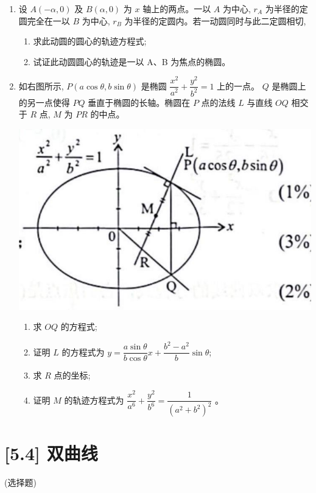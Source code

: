 \documentclass[10pt]{article}
\begin{document}
\begin{enumerate}
  \item 设 $A(-\alpha, 0)$ 及 $B(\alpha, 0)$ 为 $x$ 轴上的两点。一以 $A$ 为中心, $r_{A}$ 为半径的定圆完全在一以 $B$ 为中心, $r_{B}$ 为半径的定圆内。若一动圆同时与此二定圆相切,

  \begin{enumerate}
    \item 求此动圆的圆心的轨迹方程式;
    \item 试证此动圆圆心的轨迹是一以 A、B 为焦点的椭圆。
  \end{enumerate}


  \item 如右图所示, $P(a \cos \theta, b \sin \theta)$ 是椭圆 $\dfrac{x^{2}}{a^{2}}+\dfrac{y^{2}}{b^{2}}=1$ 上的一点。 $Q$ 是椭圆上的另一点使得 $P Q$ 垂直于椭圆的长轴。椭圆在 $P$ 点的法线 $L$ 与直线 $O Q$ 相交于 $R$ 点, $M$ 为 $P R$ 的中点。
  \begin{center}
    \includegraphics[max width=\textwidth]{2024_06_05_971e6815482d5ecd2718g-31}
    \end{center}

\begin{enumerate}
  \item 求 $OQ$ 的方程式;
  \item 证明 $L$ 的方程式为 $y=\dfrac{a \sin \theta}{b \cos \theta} x+\dfrac{b^{2}-a^{2}}{b} \sin \theta$;
  \item 求 $R$ 点的坐标;
  \item 证明 $M$ 的轨迹方程式为 $\dfrac{x^{2}}{a^{6}}+\dfrac{y^{2}}{b^{6}}=\dfrac{1}{\left(a^{2}+b^{2}\right)^{2}}$ 。
\end{enumerate}

\end{enumerate}

\section*{[5.4] 双曲线}
(选择题)
\end{document}
